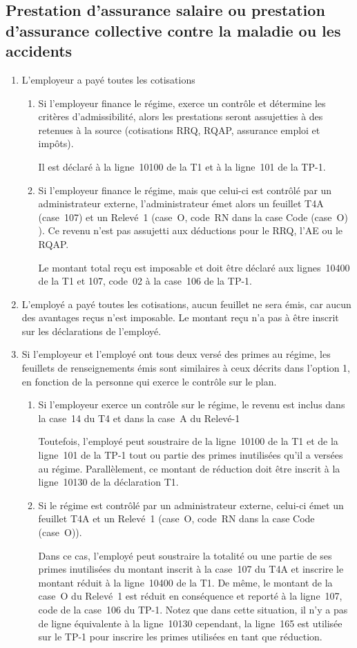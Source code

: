 \subsection{Prestation d'assurance salaire ou prestation d'assurance collective contre la maladie ou les accidents}
\begin{enumerate}
	\item L'employeur a payé toutes les cotisations
	\begin{enumerate}
		\item Si l'employeur finance le régime, exerce un contrôle et détermine les critères d'admissibilité, alors les prestations seront assujetties à des retenues à la source (cotisations RRQ, RQAP, assurance emploi et impôts).
		
		Il est déclaré à la ligne~10100 de la T1 et à la ligne~101 de la TP-1.
		\item Si l'employeur finance le régime, mais que celui-ci est contrôlé par un administrateur externe, l'administrateur émet alors un feuillet T4A (case~107) et un Relevé~1 (case~O, code~RN  dans la case Code (case~O) ). Ce revenu n'est pas assujetti aux déductions pour le RRQ, l'AE ou le RQAP.
		
		Le montant total reçu est imposable et doit être déclaré aux lignes~10400 de la T1 et 107, code~02 à la case~106 de la TP-1.
	\end{enumerate}
	\item L'employé a payé toutes les cotisations, aucun feuillet ne sera émis, car aucun des avantages reçus n'est imposable. Le montant reçu n'a pas à être inscrit sur les déclarations de l'employé.
	\item Si l'employeur et l'employé ont tous deux versé des primes au régime, les feuillets de renseignements émis sont similaires à ceux décrits dans l'option 1, en fonction de la personne qui exerce le contrôle sur le plan.
	\begin{enumerate}
		\item Si l'employeur exerce un contrôle sur le régime, le revenu est inclus dans la case~14 du T4 et dans la case~A du Relevé-1
		
		Toutefois, l'employé peut soustraire de la ligne~10100 de la T1 et de la ligne~101 de la TP-1 tout ou partie des primes inutilisées qu'il a versées au régime. Parallèlement, ce montant de réduction doit être inscrit à la ligne~10130 de la déclaration T1.
		\item Si le régime est contrôlé par un administrateur externe, celui-ci émet un feuillet T4A et un Relevé~1 (case~O, code~RN  dans la case Code (case~O)).
		
		Dans ce cas, l'employé peut soustraire la totalité ou une partie de ses primes inutilisées du montant inscrit à la case~107 du T4A et inscrire le montant réduit à la ligne~10400 de la T1. De même, le montant de la case~O du Relevé~1 est réduit en conséquence et reporté à la ligne~107, code \fg{} de la case~106 du TP-1. Notez que dans cette situation, il n'y a pas de ligne équivalente à la ligne~10130 cependant, la ligne~165 est utilisée sur le TP-1 pour inscrire les primes utilisées en tant que réduction.
	\end{enumerate}
\end{enumerate}

